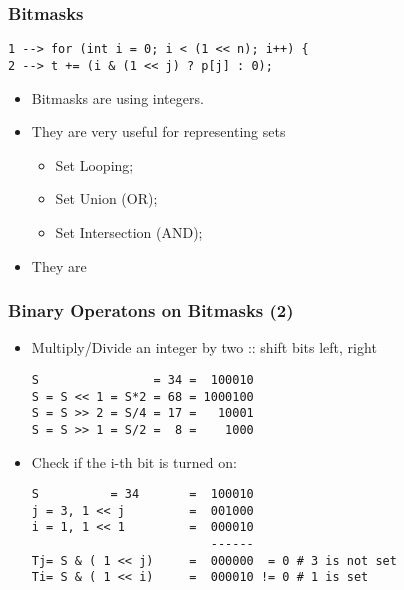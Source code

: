 \begin{frame}[fragile]
  \frametitle{Bitmasks}

\begin{block}{}
\begin{verbatim}
1 --> for (int i = 0; i < (1 << n); i++) {
2 --> t += (i & (1 << j) ? p[j] : 0);
\end{verbatim}
\end{block}

\begin{itemize}
  \item Bitmasks are  using \alert{integers}.
  \bigskip

  \item They are very useful for representing \alert{sets}
  \begin{itemize}
    \item Set Looping;
    \item Set Union (OR);
    \item Set Intersection (AND);
  \end{itemize}
  \bigskip

  \item They are 
  \end{itemize}
\end{frame}

\begin{frame}[fragile]
  \frametitle{Binary Operatons on Bitmasks (2)}
{\smaller

  \begin{itemize}
  \item Multiply/Divide an integer by two :: shift bits left, right
\begin{verbatim}
S                = 34 =  100010
S = S << 1 = S*2 = 68 = 1000100
S = S >> 2 = S/4 = 17 =   10001
S = S >> 1 = S/2 =  8 =    1000
\end{verbatim}
\bigskip

\item Check if the i-th bit is turned on:
\begin{verbatim}
S          = 34       =  100010
j = 3, 1 << j         =  001000
i = 1, 1 << 1         =  000010
                         ------
Tj= S & ( 1 << j)     =  000000  = 0 # 3 is not set
Ti= S & ( 1 << i)     =  000010 != 0 # 1 is set
\end{verbatim}

  \end{itemize}

}
\end{frame}

